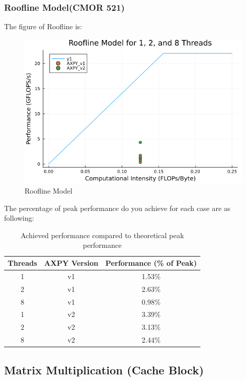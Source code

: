 \documentclass[11pt]{article}
\begin{document}
\subsubsection{Roofline Model(CMOR 521)}
The figure of Roofline is:
\begin{figure}[H]
        \centering
        \includegraphics[width=0.75\linewidth]{Assignments/HW2/docs/images/roofline_plot.png}
        \caption{Roofline Model}
        \label{fig:Roofline Model}
    \end{figure}
The percentage of peak performance do you achieve for each case are as following:
\begin{table}[H]
\centering
\begin{tabular}{ccc}
\toprule
\textbf{Threads} & \textbf{AXPY Version} & \textbf{Performance (\% of Peak)} \\
\midrule
1 & v1 & 1.53\% \\
2 & v1 & 2.63\% \\
8 & v1 & 0.98\% \\
1 & v2 & 3.39\% \\
2 & v2 & 3.13\% \\
8 & v2 & 2.44\% \\
\bottomrule
\end{tabular}
\caption{Achieved performance compared to theoretical peak performance}
\label{tab:performance}
\end{table}

\newpage

\subsection{Matrix Multiplication (Cache Block)}
\end{document}
